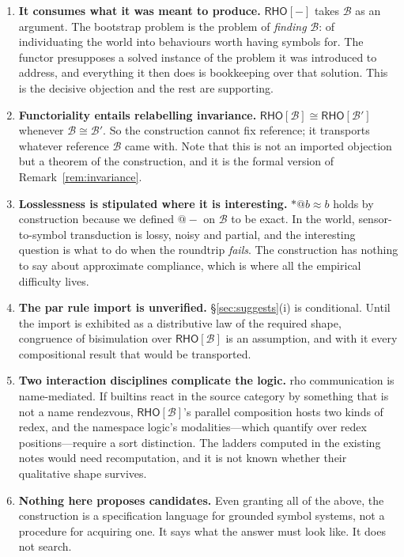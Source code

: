 \documentclass[11pt,a4paper]{article}
\makeatletter
\theoremstyle{definition}
\theoremstyle{plain}
\theoremstyle{remark}
\newcommand{\rc}{\textup{rho}}
\newcommand{\RHO}{\mathsf{RHO}}
\newcommand{\Bee}{\mathcal{B}}
\newcommand{\quo}[1]{@#1}
\newcommand{\bisim}{\approx}
\makeatother
\begin{document}
\begin{enumerate}[label=\textbf{(\alph*)},leftmargin=2.4em]

\item \textbf{It consumes what it was meant to produce.} $\RHO[-]$ takes $\Bee$ as an
argument. The bootstrap problem is the problem of \emph{finding} $\Bee$: of individuating
the world into behaviours worth having symbols for. The functor presupposes a solved
instance of the problem it was introduced to address, and everything it then does is
bookkeeping over that solution. This is the decisive objection and the rest are
supporting.

\item \textbf{Functoriality entails relabelling invariance.} $\RHO[\Bee] \cong
\RHO[\Bee']$ whenever $\Bee \cong \Bee'$. So the construction cannot fix reference; it
transports whatever reference $\Bee$ came with. Note that this is not an imported
objection but a theorem of the construction, and it is the formal version of
Remark~\ref{rem:invariance}.

\item \textbf{Losslessness is stipulated where it is interesting.} $*\quo{b} \bisim b$
holds by construction because we defined $\quo{-}$ on $\Bee$ to be exact. In the world,
sensor-to-symbol transduction is lossy, noisy and partial, and the interesting question is
what to do when the roundtrip \emph{fails}. The construction has nothing to say about
approximate compliance, which is where all the empirical difficulty lives.

\item \textbf{The par rule import is unverified.} \S\ref{sec:suggests}(i) is conditional.
Until the import is exhibited as a distributive law of the required shape, congruence of
bisimulation over $\RHO[\Bee]$ is an assumption, and with it every compositional result
that would be transported.

\item \textbf{Two interaction disciplines complicate the logic.} \rc{} communication is
name-mediated. If builtins react in the source category by something that is not a name
rendezvous, $\RHO[\Bee]$'s parallel composition hosts two kinds of redex, and the
namespace logic's modalities---which quantify over redex positions---require a sort
distinction. The ladders computed in the existing notes would need recomputation, and it
is not known whether their qualitative shape survives.

\item \textbf{Nothing here proposes candidates.} Even granting all of the above, the
construction is a specification language for grounded symbol systems, not a procedure for
acquiring one. It says what the answer must look like. It does not search.

\end{enumerate}
\end{document}
